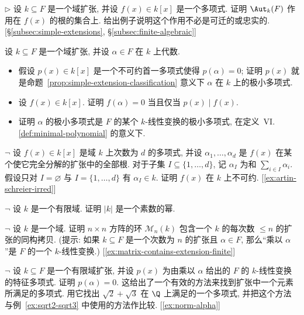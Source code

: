 \begin{prob}\label{ex:aut-action-roots}
$\triangleright$ 设 $k\subseteq F$ 是一个域扩张, 并设 $f(x)\in k[x]$ 是一个多项式. 证明 $\Aut_k(F)$ 作用在 $f(x)$ 的根的集合上. 给出例子说明这个作用不必是可迁的或忠实的. [§\ref{subsec:simple-extensions}, §\ref{subsec:finite-algebraic}]
\end{prob}

\begin{prob}\label{ex:minpoly-props}
设 $k\subseteq F$ 是一个域扩张, 并设 $\alpha\in F$ 在 $k$ 上代数.

\begin{itemize}
\item 假设 $p(x)\in k[x]$ 是一个不可约首一多项式使得 $p(\alpha)=0$; 证明 $p(x)$ 就是命题~\ref{prop:simple-extension-classification} 意义下 $\alpha$ 在 $k$ 上的极小多项式.
\item 设 $f(x)\in k[x]$. 证明 $f(\alpha)=0$ 当且仅当 $p(x)\mid f(x)$.
\item 证明 $\alpha$ 的极小多项式是 $F$ 的某个 $k$-线性变换的极小多项式, 在定义~VI.\ref{def:minimal-polynomial} 的意义下.
\end{itemize}
\end{prob}

\begin{prob}\label{ex:irred-via-sums}
$\neg$ 设 $f(x)\in k[x]$ 是域 $k$ 上次数为 $d$ 的多项式, 并设 $\alpha_1,\ldots,\alpha_d$ 是 $f(x)$ 在某个使它完全分解的扩张中的全部根. 对于子集 $I\subseteq\{1,\ldots,d\}$, 记 $\alpha_I$ 为和 $\sum_{i\in I}\alpha_i$. 假设只对 $I=\varnothing$ 与 $I=\{1,\ldots,d\}$ 有 $\alpha_I\in k$. 证明 $f(x)$ 在 $k$ 上不可约. [\ref{ex:artin-schreier-irred}]
\end{prob}

\begin{prob}\label{ex:finite-field-order}
$\neg$ 设 $k$ 是一个有限域. 证明 $|k|$ 是一个素数的幂.
\end{prob}

\begin{prob}\label{ex:matrix-contains-extension}
$\neg$ 设 $k$ 是一个域. 证明 $n\times n$ 方阵的环 $\mathcal{M}_n(k)$ 包含一个 $k$ 的每次数 $\leq n$ 的扩张的同构拷贝. (提示: 如果 $k\subseteq F$ 是一个次数为 $n$ 的扩张且 $\alpha\in F$, 那么``乘以 $\alpha$''是 $F$ 的一个 $k$-线性变换.) [\ref{ex:matrix-contains-extension-finite}]
\end{prob}

\begin{prob}\label{ex:charpoly-alpha}
$\neg$ 设 $k\subseteq F$ 是一个有限域扩张, 并设 $p(x)$ 为由乘以 $\alpha$ 给出的 $F$ 的 $k$-线性变换的特征多项式. 证明 $p(\alpha)=0$.
这给出了一个有效的方法来找到扩张中一个元素所满足的多项式. 用它找出 $\sqrt{2}+\sqrt{3}$ 在 $\Q$ 上满足的一个多项式, 并把这个方法与例~\ref{ex:sqrt2-sqrt3} 中使用的方法作比较. [\ref{ex:norm-alpha}]
\end{prob}

